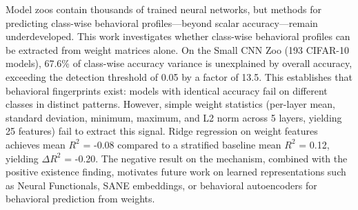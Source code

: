 
Model zoos contain thousands of trained neural networks, but methods for predicting class-wise behavioral profiles---beyond scalar accuracy---remain underdeveloped. This work investigates whether class-wise behavioral profiles can be extracted from weight matrices alone. On the Small CNN Zoo (193 CIFAR-10 models), 67.6\% of class-wise accuracy variance is unexplained by overall accuracy, exceeding the detection threshold of 0.05 by a factor of 13.5. This establishes that behavioral fingerprints exist: models with identical accuracy fail on different classes in distinct patterns. However, simple weight statistics (per-layer mean, standard deviation, minimum, maximum, and L2 norm across 5 layers, yielding 25 features) fail to extract this signal. Ridge regression on weight features achieves mean $R^2$ = -0.08 compared to a stratified baseline mean $R^2$ = 0.12, yielding $\Delta R^2$ = -0.20. The negative result on the mechanism, combined with the positive existence finding, motivates future work on learned representations such as Neural Functionals, SANE embeddings, or behavioral autoencoders for behavioral prediction from weights.
